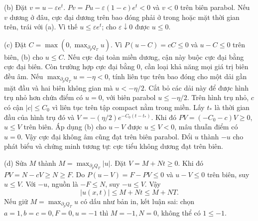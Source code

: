 \documentclass[10pt,a4paper]{article}
\begin{document}
(b) Đặt $v=u-\varepsilon e^t$. $Pv=Pu-\varepsilon(1-c)e^t<0$ và $v<0$ trên biên parabol. Nếu $v$ dương ở đâu, cực đại dương trên bao đóng phải ở trong hoặc mặt thời gian trên, trái với (a). Vì thế $u\le\varepsilon e^t$; cho $\varepsilon\downarrow0$ được $u\le0$.

(c) Đặt $C=\max(0,\max_{\partial_pQ_T}u)$. Vì $P(u-C)=cC\le0$ và $u-C\le0$ trên biên, (b) cho $u\le C$. Nếu cực đại toàn miền dương, cận này buộc cực đại bằng cực đại biên. Còn trường hợp cực đại bằng $0$, cần loại khả năng mọi giá trị biên đều âm.
Nếu $\max_{\partial_pQ_T}u=-\eta<0$, tính liên tục trên bao đóng cho một dải gần mặt đầu và hai biên không gian mà $u<-\eta/2$. Cắt bỏ các dải này để được hình trụ nhỏ hơn chứa điểm có $u=0$, với biên parabol $u\le-\eta/2$. Trên hình trụ nhỏ, $c$ có cận $|c|\le C_0$ vì liên tục trên tập compact nằm trong miền. Lấy $t_*$ là thời gian đầu của hình trụ đó và $V=-(\eta/2)e^{-C_0(t-t_*)}$. Khi đó $PV=(-C_0-c)V\ge0$, $u\le V$ trên biên. Áp dụng (b) cho $u-V$ được $u\le V<0$, mâu thuẫn điểm có $u=0$. Vậy cực đại không âm cũng đạt trên biên parabol. Đổi $u$ thành $-u$ cho phát biểu và chứng minh tương tự: cực tiểu không dương đạt trên biên.

(d) Sửa $M$ thành $M=\max_{\partial_pQ_T}|u|$. Đặt $V=M+Nt\ge0$. Khi đó $PV=N-cV\ge N\ge F$. Do $P(u-V)=F-PV\le0$ và $u-V\le0$ trên biên, suy $u\le V$. Với $-u$, nguồn là $-F\le N$, suy $-u\le V$. Vậy
\[|u(x,t)|\le M+Nt\le M+NT.\]
Nếu giữ $M=\max_{\partial_pQ_T}u$ có dấu như bản in, kết luận sai: chọn $a=1,b=c=0,F=0,u=-1$ thì $M=-1,N=0$, không thể có $1\le-1$.
\end{document}
